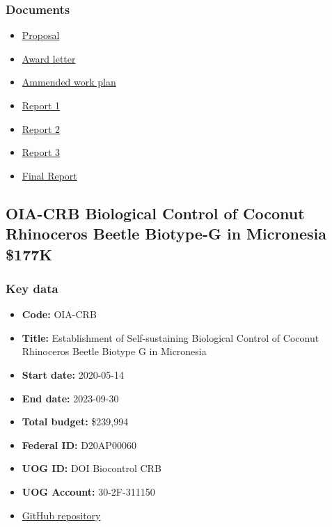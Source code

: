 \subsubsection{Documents}
\begin{itemize}
	\setlength\itemsep{0em}	
	\item \href{https://github.com/aubreymoore/Miscellaneous-Docs-for-CFES2018/raw/master/MooreFB19.pdf}{Proposal}		
	\item \href{https://github.com/aubreymoore/FY2018-Farm-Bill-Suggestion/blob/master/from\%20EFG/Award\%20Document.pdf}{Award letter}			
	\item \href{https://github.com/aubreymoore/FY2018-Farm-Bill-Suggestion/raw/master/extension-request/MooreFB19WorkPlan-ammended.pdf}{Ammended work plan}		
	\item \href{https://github.com/aubreymoore/FY19-PPA-Report-1/raw/master/PPA19-report-1.pdf}{Report 1}	
	\item \href{https://github.com/aubreymoore/FY19-PPA-Report-1/raw/master/PPA19-report2.pdf}{Report 2}		
	\item \href{https://github.com/aubreymoore/FY19-PPA-Report-1/raw/master/PPA19-report3.pdf}{Report 3}		
	\item \href{https://github.com/aubreymoore/FY19-PPA-Report-1/raw/master/PPA19-FINAL.pdf}{Final Report}
\end{itemize}




\clearpage
\subsection{OIA-CRB Biological Control of Coconut Rhinoceros Beetle Biotype-G in Micronesia \$177K}
\label{OIA-CRB}

\subsubsection{Key data}
\begin{itemize}
	\setlength\itemsep{0em}	
	\item \textbf{Code:} OIA-CRB
	\item \textbf{Title:} Establishment of Self-sustaining Biological Control of Coconut Rhinoceros Beetle Biotype G in Micronesia
	\item \textbf{Start date:} 2020-05-14
	\item \textbf{End date:} 2023-09-30
	\item \textbf{Total budget:} \$239,994
	\item \textbf{Federal ID:} D20AP00060
	\item \textbf{UOG ID:} DOI Biocontrol CRB
	\item \textbf{UOG Account:} 30-2F-311150
	\item \href{https://github.com/aubreymoore/2020-DOI-CRB-Biocontrol}{GitHub repository}
\end{itemize}

